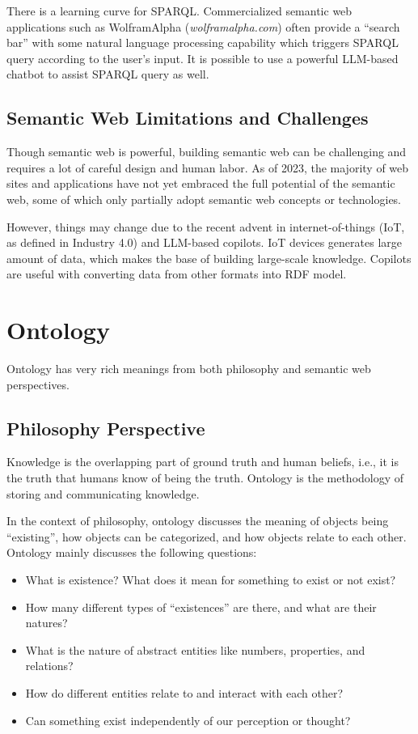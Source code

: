 There is a learning curve for SPARQL. Commercialized semantic web applications such as WolframAlpha (\textit{wolframalpha.com}) often provide a ``search bar'' with some natural language processing capability which triggers SPARQL query according to the user's input. It is possible to use a powerful LLM-based chatbot to assist SPARQL query as well.

\subsection{Semantic Web Limitations and Challenges}

Though semantic web is powerful, building semantic web can be challenging and requires a lot of careful design and human labor. As of 2023, the majority of web sites and applications have not yet embraced the full potential of the semantic web, some of which only partially adopt semantic web concepts or technologies.

However, things may change due to the recent advent in internet-of-things (IoT, as defined in Industry 4.0) and LLM-based copilots. IoT devices generates large amount of data, which makes the base of building large-scale knowledge. Copilots are useful with converting data from other formats into RDF model. 


\section{Ontology} \label{sec:ontology}

Ontology has very rich meanings from both philosophy and semantic web perspectives.

\subsection{Philosophy Perspective}

Knowledge is the overlapping part of ground truth and human beliefs, i.e., it is the truth that humans know of being the truth. Ontology is the methodology of storing and communicating knowledge.

In the context of philosophy, ontology discusses the meaning of objects being ``existing'', how objects can be categorized, and how objects relate to each other. Ontology mainly discusses the following questions:

\begin{itemize}
  \item What is existence? What does it mean for something to exist or not exist?
  \item How many different types of ``existences'' are there, and what are their natures?
  \item What is the nature of abstract entities like numbers, properties, and relations?
  \item How do different entities relate to and interact with each other?
  \item Can something exist independently of our perception or thought?
\end{itemize}

